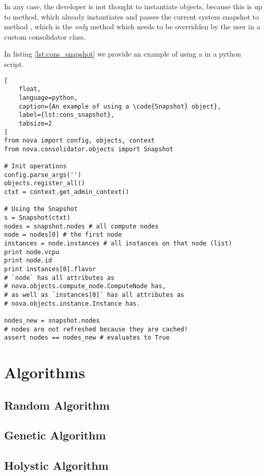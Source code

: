In any case, the developer is not thought to instantiate  objects, because this is up to  method, which already instantiates and passes the current system snapshot to method , which is the \emph{only} method which needs to be overridden by the user in a custom consolidator class.

In listing \ref{lst:cons_snapshot} we provide an example of using a  in a python script.

\begin{lstlisting}[
	float,
	language=python,
	caption={An example of using a \code{Snapshot} object},
	label={lst:cons_snapshot},
	tabsize=2
]
from nova import config, objects, context
from nova.consolidator.objects import Snapshot

# Init operations
config.parse_args('')
objects.register_all()
ctxt = context.get_admin_context()

# Using the Snapshot
s = Snapshot(ctxt)
nodes = snapshot.nodes # all compute nodes
node = nodes[0] # the first node
instances = node.instances # all instances on that node (list)
print node.vcpu
print node.id
print instances[0].flavor
# `node` has all attributes as
# nova.objects.compute_node.ComputeNode has,
# as well as `instances[0]` has all attributes as
# nova.objects.instance.Instance has.

nodes_new = snapshot.nodes
# nodes are not refreshed because they are cached!
assert nodes == nodes_new # evaluates to True
\end{lstlisting}

\section{Algorithms}
\label{sec:cons_algs}

\subsection{Random Algorithm}
\label{sub:algs_rnd}

\subsection{Genetic Algorithm}
\label{sub:algs_rnd}

\subsection{Holystic Algorithm}
\label{sub:algs_rnd}